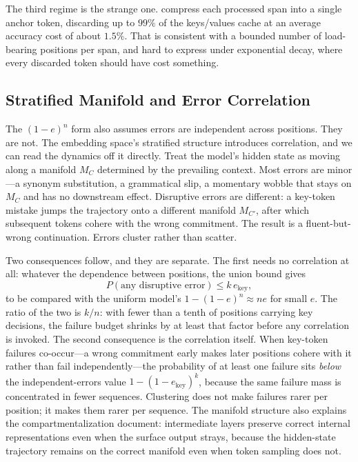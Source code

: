 The third regime is the strange one. \citet{pang2024anchor} compress each processed span into a single anchor token, discarding up to $99\%$ of the keys/values cache at an average accuracy cost of about $1.5\%$. That is consistent with a bounded number of load-bearing positions per span, and hard to express under exponential decay, where every discarded token should have cost something.

\subsection{Stratified Manifold and Error Correlation}

The $(1-e)^n$ form also assumes errors are independent across positions. They are not. The embedding space's stratified structure \citep{li2025unraveling} introduces correlation, and we can read the dynamics off it directly. Treat the model's hidden state as moving along a manifold $M_C$ determined by the prevailing context. Most errors are minor---a synonym substitution, a grammatical slip, a momentary wobble that stays on $M_C$ and has no downstream effect. Disruptive errors are different: a key-token mistake jumps the trajectory onto a different manifold $M_{C'}$, after which subsequent tokens cohere with the wrong commitment. The result is a fluent-but-wrong continuation. Errors cluster rather than scatter.

Two consequences follow, and they are separate. The first needs no correlation at all: whatever the dependence between positions, the union bound gives
\begin{equation}
\label{eq:union}
P(\text{any disruptive error}) \le k\, e_{\text{key}},
\end{equation}
to be compared with the uniform model's $1-(1-e)^n \approx n e$ for small $e$. The ratio of the two is $k/n$: with fewer than a tenth of positions carrying key decisions, the failure budget shrinks by at least that factor before any correlation is invoked. The second consequence is the correlation itself. When key-token failures co-occur---a wrong commitment early makes later positions cohere with it rather than fail independently---the probability of at least one failure sits \emph{below} the independent-errors value $1-(1-e_{\text{key}})^k$, because the same failure mass is concentrated in fewer sequences. Clustering does not make failures rarer per position; it makes them rarer per sequence. The manifold structure also explains the compartmentalization \citet{gao2024insights} document: intermediate layers preserve correct internal representations even when the surface output strays, because the hidden-state trajectory remains on the correct manifold even when token sampling does not.

